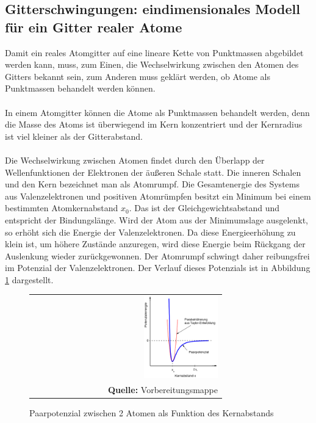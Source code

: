 \documentclass[a4paper,titlepage]{scrartcl}
\numberwithin{equation}{section}
\begin{document}
\subsection{Gitterschwingungen: eindimensionales Modell für ein Gitter realer Atome}
Damit ein reales Atomgitter auf eine lineare Kette von Punktmassen abgebildet werden kann, muss, zum Einen, die Wechselwirkung zwischen den Atomen des Gitters bekannt sein, zum Anderen muss geklärt werden, ob Atome als Punktmassen behandelt werden können.\\ \\
In einem Atomgitter können die Atome als Punktmassen behandelt werden, denn die Masse des Atoms ist überwiegend im Kern konzentriert und der Kernradius ist viel kleiner als der Gitterabstand.\\ \\
Die Wechselwirkung zwischen Atomen findet durch den Überlapp der Wellenfunktionen der Elektronen der äußeren Schale statt. Die inneren Schalen und den Kern bezeichnet man als Atomrumpf. Die Gesamtenergie des Systems aus Valenzelektronen und positiven Atomrümpfen besitzt ein Minimum bei einem bestimmten Atomkernabstand $x_0$. Das ist der Gleichgewichtsabstand und entspricht der Bindungslänge. Wird der Atom aus der Minimumslage ausgelenkt, so erhöht sich die Energie der Valenzelektronen. Da diese Energieerhöhung zu klein ist, um höhere Zustände anzuregen, wird diese Energie beim Rückgang der Auslenkung wieder zurückgewonnen. Der Atomrumpf schwingt daher reibungsfrei im Potenzial der Valenzelektronen. Der Verlauf dieses Potenzials ist in Abbildung \ref{fig:gitterschwingung} dargestellt.
\begin{figure}[H]
	\centering
	\begin{tabular}{@{}r@{}}
		\includegraphics[width=0.4\textwidth]{images/gitterschwingung.png}\\
		\footnotesize\sffamily\textbf{Quelle:} Vorbereitungsmappe \cite{vorbereitungsmappe}
	\end{tabular}
	\caption{Paarpotenzial zwischen 2 Atomen als Funktion des Kernabstands}
    \label{fig:gitterschwingung}
\end{figure}
\end{document}
